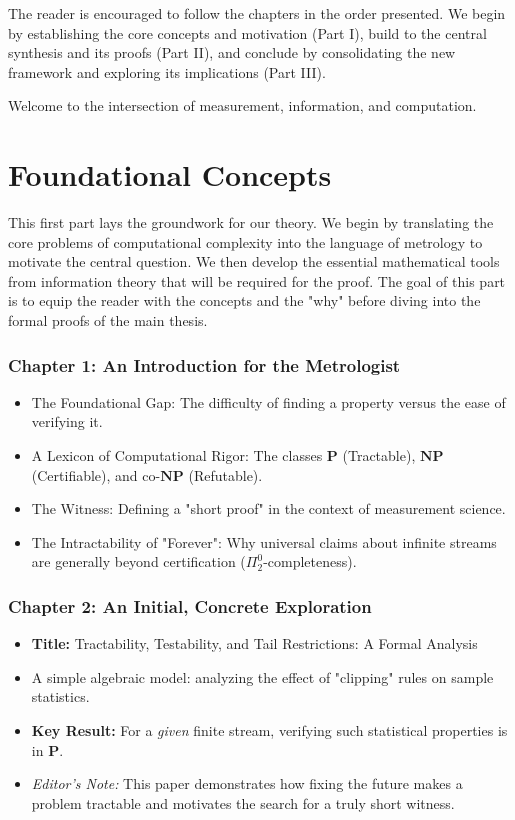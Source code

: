 \documentclass[12pt]{article}
\begin{document}
The reader is encouraged to follow the chapters in the order presented. We begin by establishing the core concepts and motivation (Part I), build to the central synthesis and its proofs (Part II), and conclude by consolidating the new framework and exploring its implications (Part III).

Welcome to the intersection of measurement, information, and computation.

\newpage
\tableofcontents
\newpage

\part[Foundational Concepts]{Foundational Concepts}

This first part lays the groundwork for our theory. We begin by translating the core problems of computational complexity into the language of metrology to motivate the central question. We then develop the essential mathematical tools from information theory that will be required for the proof. The goal of this part is to equip the reader with the concepts and the "why" before diving into the formal proofs of the main thesis.

\section*{Chapter 1: An Introduction for the Metrologist}
\begin{itemize}
    \item The Foundational Gap: The difficulty of finding a property versus the ease of verifying it.
    \item A Lexicon of Computational Rigor: The classes $\mathbf{P}$ (Tractable), $\mathbf{NP}$ (Certifiable), and co-$\mathbf{NP}$ (Refutable).
    \item The Witness: Defining a "short proof" in the context of measurement science.
    \item The Intractability of "Forever": Why universal claims about infinite streams are generally beyond certification ($\Pi^0_2$-completeness).
\end{itemize}

\section*{Chapter 2: An Initial, Concrete Exploration}
\begin{itemize}
    \item \textbf{Title:} Tractability, Testability, and Tail Restrictions: A Formal Analysis
    \item A simple algebraic model: analyzing the effect of "clipping" rules on sample statistics.
    \item \textbf{Key Result:} For a \emph{given} finite stream, verifying such statistical properties is in $\mathbf{P}$.
    \item \textit{Editor's Note:} This paper demonstrates how fixing the future makes a problem tractable and motivates the search for a truly short witness.
\end{itemize}
\end{document}
